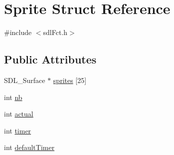 \hypertarget{struct_sprite}{\section{Sprite Struct Reference}
\label{struct_sprite}
}


{\ttfamily \#include $<$sdl\-Fct.\-h$>$}

\subsection*{Public Attributes}
\begin{DoxyCompactItemize}
\item 
S\-D\-L\-\_\-\-Surface $\ast$ \hyperlink{struct_sprite_ad8469d5efb3c49f4503cdd2e1e0cf84e}{sprites} \mbox{[}25\mbox{]}
\item 
int \hyperlink{struct_sprite_af161aa99ddad84227993c7e115c42f8a}{nb}
\item 
int \hyperlink{struct_sprite_aaa3a09f1b82e5fad937e3df6dafd3719}{actual}
\item 
int \hyperlink{struct_sprite_a34eca7b18a9dcbad3a2e9c3bfa40f3c8}{timer}
\item 
int \hyperlink{struct_sprite_a7ab2c9d62f28c94906cdee3ef441cc29}{default\-Timer}
\end{DoxyCompactItemize}


